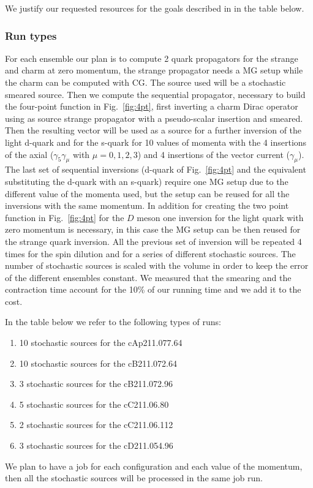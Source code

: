 

We justify our requested resources for the goals described
in  in the table below.

\subsubsection{Run types \label{sec:runtypes}}


For each ensemble our plan is to compute  2 quark propagators for the strange and charm  at zero momentum, the strange propagator needs a MG 
setup while the charm can be computed with CG.
The source used will be a stochastic smeared source. 
Then we compute the sequential propagator, necessary to build the four-point function in Fig.~\ref{fig:4pt}, first inverting a charm Dirac operator using as source strange propagator with a pseudo-scalar insertion and smeared. Then the resulting vector will be used as a source for a further inversion of the light d-quark and for the s-quark for 10 values of momenta with the 4 insertions of the axial ($\gamma_5\gamma_\mu$ with $\mu=0,1,2,3$) and 4 insertions of the vector current ($\gamma_\mu$). The last set of sequential inversions (d-quark of Fig.~\ref{fig:4pt} and the equivalent substituting the d-quark with an s-quark) require one MG setup due to the different value of the momenta used, but the setup can be reused for all the inversions with the same momentum.
In addition for creating the two point function in Fig.~\ref{fig:4pt} for the $D$ meson one
inversion for the light quark with zero momentum is necessary, in this case the MG setup can be then reused for the strange quark inversion.
All the previous set of inversion will be repeated 4 times for the spin dilution and for a series of different stochastic sources. 
The number of stochastic sources is scaled with the volume in order to keep the error of the different ensembles constant. We measured that the smearing and the contraction time account for the 10\% of our running time and we add it to the cost.

In the table below we refer to the following types of runs:
\begin{enumerate}
	\item \label{rt:cAp64} 10 stochastic sources for the cAp211.077.64
	\item \label{rt:cB64} 10 stochastic sources for the cB211.072.64
	\item \label{rt:cB96} 3 stochastic sources for the cB211.072.96
	\item \label{rt:cC80}  5 stochastic sources for the cC211.06.80
	\item \label{rt:cC112} 2 stochastic sources for the cC211.06.112	
	\item \label{rt:cD96}  3 stochastic sources for the cD211.054.96
\end{enumerate}
We plan to have a job for each configuration and each value of the momentum, then 
all the stochastic sources will be processed in the same job run.

